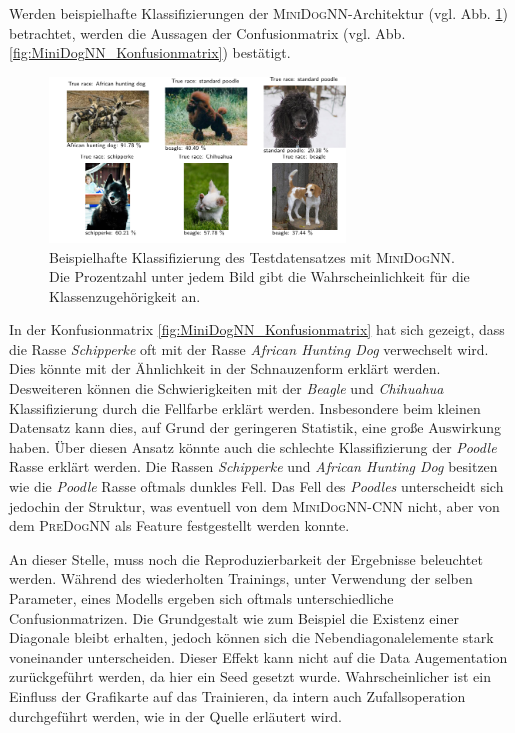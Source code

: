 Werden beispielhafte Klassifizierungen der \textsc{MiniDogNN}-Architektur (vgl. Abb. \ref{fig:klasifizierung_MiniDogNN}) betrachtet, werden die Aussagen der Confusionmatrix
(vgl. Abb. \ref{fig:MiniDogNN_Konfusionmatrix}) bestätigt.
\begin{figure}
\centering
\includegraphics[width = 0.7\textwidth]{../../final_data/MiniNN_n5/visualize_predictions.pdf}
\caption{Beispielhafte Klassifizierung des Testdatensatzes mit \textsc{MiniDogNN}.
        Die Prozentzahl unter jedem Bild gibt die Wahrscheinlichkeit für die Klassenzugehörigkeit an.}
\label{fig:klasifizierung_MiniDogNN}
\end{figure}
In der Konfusionmatrix \ref{fig:MiniDogNN_Konfusionmatrix} hat sich gezeigt, dass
die Rasse \emph{Schipperke} oft mit der Rasse \emph{African Hunting Dog} verwechselt
wird. Dies könnte mit der Ähnlichkeit in der Schnauzenform erklärt werden. Desweiteren
können die Schwierigkeiten mit der \emph{Beagle} und \emph{Chihuahua} Klassifizierung
durch die Fellfarbe erklärt werden. Insbesondere beim kleinen Datensatz kann dies,
auf Grund der geringeren Statistik, eine große Auswirkung haben. Über diesen Ansatz
könnte auch die schlechte Klassifizierung der \emph{Poodle} Rasse erklärt werden.
Die Rassen \emph{Schipperke} und \emph{African Hunting Dog} besitzen wie die
\emph{Poodle} Rasse oftmals dunkles Fell. Das Fell des \emph{Poodles} unterscheidt sich
jedochin der Struktur, was eventuell von dem \textsc{MiniDogNN}-CNN nicht, aber von dem
\textsc{PreDogNN} als Feature festgestellt werden konnte.

An dieser Stelle, muss noch die Reproduzierbarkeit der Ergebnisse beleuchtet werden.
Während des wiederholten Trainings, unter Verwendung der selben Parameter, eines Modells
ergeben sich oftmals unterschiedliche Confusionmatrizen. Die Grundgestalt wie zum Beispiel
die Existenz einer Diagonale bleibt erhalten, jedoch können sich die Nebendiagonalelemente
stark voneinander unterscheiden. Dieser Effekt kann nicht auf die Data Augementation
zurückgeführt werden, da hier ein Seed gesetzt wurde. Wahrscheinlicher ist ein Einfluss
der Grafikarte auf das Trainieren, da intern auch Zufallsoperation durchgeführt werden,
wie in der Quelle \cite{Reproduzierbarkeit} erläutert wird.

